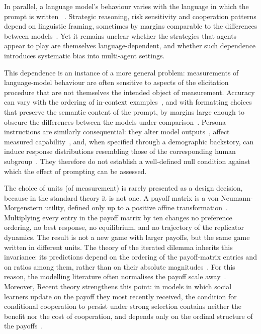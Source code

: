 \documentclass[11pt,a4paper]{article}
\begin{document}
In parallel, a language model's behaviour varies with the language in which the
prompt is written ~\cite{buscemi2025fairgame}. Strategic reasoning, risk
sensitivity and cooperation patterns depend on linguistic framing, sometimes by
margins comparable to the differences between
models~\cite{loreheydari2024strategic,buscemi2025llms,buscemi2025strategic}.
Yet it remains unclear whether the strategies that agents appear to play are
themselves language-dependent, and whether such dependence introduces systematic
bias into multi-agent settings.




This dependence is an instance of a more general problem: measurements of
language-model behaviour are often sensitive to aspects of the elicitation
procedure that are not themselves the intended object of measurement. Accuracy
can vary with the ordering of in-context examples~\cite{lu2022fantastically},
and with formatting choices that preserve the semantic content of the prompt,
by margins large enough to obscure the differences between the models under
comparison~\cite{sclar2024quantifying}. Persona instructions are similarly
consequential: they alter model outputs~\cite{deshpande2023toxicity}, affect
measured capability~\cite{salewski2023context}, and, when specified through a
demographic backstory, can induce response distributions resembling those of
the corresponding human subgroup~\cite{argyle2023out}. They therefore do not
establish a well-defined null condition against which the effect of prompting
can be assessed.


The choice of units (of measurement)  is rarely presented as a design decision, because
in the standard theory it is not one. A payoff matrix is a von Neumann-Morgenstern
utility, defined only up to a positive affine
transformation~\cite{von2007theory,luce1957games}. Multiplying every
entry in the payoff matrix by ten changes no preference ordering, no best response, no
equilibrium, and no trajectory of the replicator dynamics. The result is not a
new game with larger payoffs, but the same game written in different units.  The
theory of the iterated dilemma inherits this invariance: its predictions depend 
on the ordering of the  payoff-matrix entries  and on ratios among them, rather than on
their absolute magnitudes~\cite{axelrod1981evolution,nowak1992tit,nowak1993strategy,pressDyson2012}.
For this reason, the modelling literature often normalises the payoff scale
away~\cite{szabo2007evolutionary,perc2010coevolutionary,wang2015universal}.
Moreover, Recent theory strengthens this point: in models in which social
learners update on the payoff they most recently received, the condition for
conditional cooperation to persist under strong selection contains neither the
benefit nor the cost of cooperation, and depends only on the ordinal structure
of the payoffs~\cite{glynatsi2024evolution}.
\end{document}
